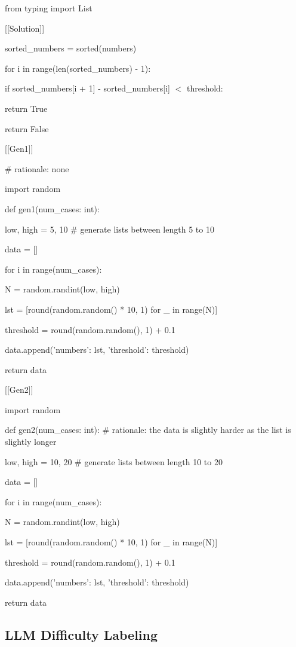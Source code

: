 {\begin{minipage}{0.95\linewidth}
from typing import List

[[Solution]]

sorted\_numbers = sorted(numbers)

for i in range(len(sorted\_numbers) - 1):

if sorted\_numbers[i + 1] - sorted\_numbers[i] $<$ threshold:

\qquad return True

return False

[[Gen1]]

\# rationale: none

import random

def gen1(num\_cases: int):

\qquad    low, high = 5, 10 \# generate lists between length 5 to 10

\qquad    data = []

\qquad    for i in range(num\_cases):

\qquad\qquad        N = random.randint(low, high)

\qquad\qquad        lst = [round(random.random() * 10, 1) for \_ in range(N)]

\qquad\qquad        threshold = round(random.random(), 1) + 0.1

\qquad\qquad        data.append({'numbers': lst, 'threshold': threshold})

\qquad     return data

[[Gen2]]

import random

def gen2(num\_cases: int): \# rationale: the data is slightly harder as the list is slightly longer

\qquad     low, high = 10, 20 \# generate lists between length 10 to 20

\qquad     data = []

\qquad     for i in range(num\_cases):

\qquad \qquad         N = random.randint(low, high)

\qquad         lst = [round(random.random() * 10, 1) for \_ in range(N)]

\qquad         threshold = round(random.random(), 1) + 0.1

\qquad         data.append({'numbers': lst, 'threshold': threshold})

\qquad     return data

        \end{minipage}
    }


\subsection{LLM Difficulty Labeling}
\label{sec:difficulty}

